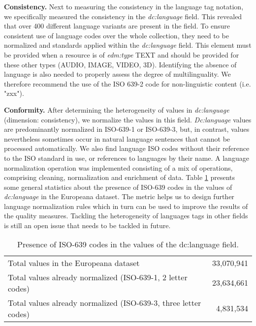 \noindent\textbf{Consistency.}
Next to measuring the consistency in the language tag notation, we specifically measured the consistency in the \textit{dc:language} field. This revealed that over 400 different language variants are present in the field. 
To ensure consistent use of language codes over the whole collection, they need to be normalized and standards applied within the \textit{dc:language} field. This element must be provided when a resource is of \textit{edm:type} TEXT and should be provided for these other types (AUDIO, IMAGE, VIDEO, 3D). Identifying the absence of language is also needed to properly assess the degree of multilinguality. We therefore recommend the use of the ISO 639-2 code for non-linguistic content (i.e. "zxx").

\noindent\textbf{Conformity.}
After determining the heterogeneity of values in \textit{dc:language} (dimension: consistency), we normalize the values in this field. \textit{Dc:language} values are predominantly normalized in ISO-639-1 or ISO-639-3, but, in contrast, values nevertheless sometimes occur in natural language sentences that cannot be processed automatically. We also find language ISO codes without their reference to the ISO standard in use, or references to languages by their name.
A language normalization operation was implemented consisting of a mix of operations, comprising cleaning, normalization and enrichment of data. 
Table \ref{Tab:iso} presents some general statistics about the presence of ISO-639 codes in the values of \textit{dc:language} in the Europeana dataset.
The metric helps us to design further language normalization rules which in turn can be used to improve the results of the quality measures. 
Tackling the heterogeneity of languages tags in other fields is still an open issue that needs to be tackled in future. 

\begin{table}[tb]
\caption{Presence of ISO-639 codes in the values of the dc:language field.}
\centering
\begin{tabular}{ l r }
\hline\noalign{\smallskip}
Total values in the Europeana dataset & 33,070,941 \\
Total values already normalized
(ISO-639-1, 2 letter codes)           & 23,634,661 \\
Total values already normalized
 (ISO-639-3, three letter codes)      &  4,831,534 \\ \hline
\end{tabular}
\label{Tab:iso}
\end{table}


